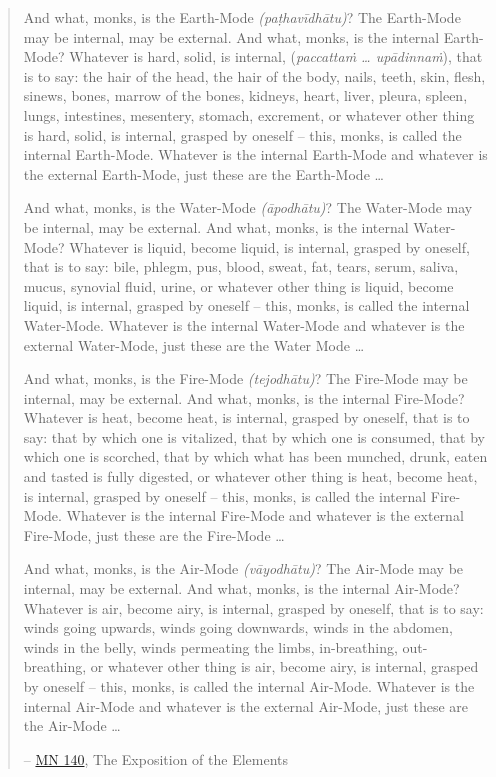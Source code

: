 \begin{quote}
And what, monks, is the Earth-Mode \emph{(paṭhavīdhātu)}? The Earth-Mode may be internal, may be external. And what, monks, is the internal Earth-Mode? Whatever is hard, solid, is internal,  (\emph{paccattaṁ \ldots{} upādinnaṁ}), that is to say: the hair of the head, the hair of the body, nails, teeth, skin, flesh, sinews, bones, marrow of the bones, kidneys, heart, liver, pleura, spleen, lungs, intestines, mesentery, stomach, excrement, or whatever other thing is hard, solid, is internal, grasped by oneself -- this, monks, is called the internal Earth-Mode. Whatever is the internal Earth-Mode and whatever is the external Earth-Mode, just these are the Earth-Mode \ldots{}

And what, monks, is the Water-Mode \emph{(āpodhātu)}? The Water-Mode may be internal, may be external. And what, monks, is the internal Water-Mode? Whatever is liquid, become liquid, is internal, grasped by oneself, that is to say: bile, phlegm, pus, blood, sweat, fat, tears, serum, saliva, mucus, synovial fluid, urine, or whatever other thing is liquid, become liquid, is internal, grasped by oneself -- this, monks, is called the internal Water-Mode. Whatever is the internal Water-Mode and whatever is the external Water-Mode, just these are the Water Mode \ldots{}

And what, monks, is the Fire-Mode \emph{(tejodhātu)}? The Fire-Mode may be internal, may be external. And what, monks, is the internal Fire-Mode? Whatever is heat, become heat, is internal, grasped by oneself, that is to say: that by which one is vitalized, that by which one is consumed, that by which one is scorched, that by which what has been munched, drunk, eaten and tasted is fully digested, or whatever other thing is heat, become heat, is internal, grasped by oneself -- this, monks, is called the internal Fire-Mode. Whatever is the internal Fire-Mode and whatever is the external Fire-Mode, just these are the Fire-Mode \ldots{}

And what, monks, is the Air-Mode \emph{(vāyodhātu)}? The Air-Mode may be internal, may be external. And what, monks, is the internal Air-Mode? Whatever is air, become airy, is internal, grasped by oneself, that is to say: winds going upwards, winds going downwards, winds in the abdomen, winds in the belly, winds permeating the limbs, in-breathing, out-breathing, or whatever other thing is air, become airy, is internal, grasped by oneself -- this, monks, is called the internal Air-Mode. Whatever is the internal Air-Mode and whatever is the external Air-Mode, just these are the Air-Mode \ldots{}

 -- \href{https://suttacentral.net/mn140/en/bodhi}{MN 140}, The Exposition of the Elements
\end{quote}

